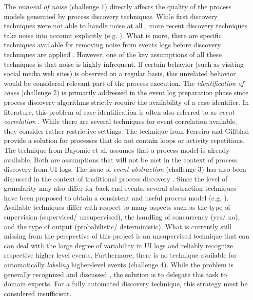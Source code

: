 The \textit{removal of noise} (challenge 1) directly affects the quality of the process models generated by process discovery techniques. While first discovery techniques were not able to handle noise at all \cite{van2004workflow}, more recent discovery techniques take noise into account explicitly (e.g. \cite{weijters2003rediscovering,leemans2013discovering,van2016avoiding}). What is more, there are specific techniques available for removing noise from events logs before discovery techniques are applied \cite{tax2017discovering,CHENG2015138}. However, one of the key assumptions of all these techniques is that noise is highly infrequent. If certain behavior (such as visiting social media web sites) is observed on a regular basis, this unrelated behavior would be considered relevant part of the process execution. 
%
The\textit{ identification of cases} (challenge 2) is primarily addressed in the event log preparation phase since process discovery algorithms strictly require the availability of a case identifier. In literature, this problem of case identification is often also referred to as \textit{event correlation} \cite{diba2020extraction}. While there are several techniques for event correlation available, they consider rather restrictive settings. The technique from Ferreira and Gillblad  \cite{ferreira2009discovering} provide a solution for processes that do not contain loops or activity repetitions. The technique from Bayomie et al. \cite{bayomie2019probabilistic} assumes that a process model is already available. Both are assumptions that will not be met in the context of process discovery from UI logs. 
%
The issue of \textit{event abstraction} (challenge 3) has also been discussed in the context of traditional process discovery \cite{van2020event,diba2020extraction}. Since the level of granularity may also differ for back-end events, several abstraction techniques have been proposed to obtain a consistent and useful process model (e.g. \cite{baier2014bridging,van2020event,de2020event}). Available techniques differ with respect to many aspects such as the type of supervision (supervised/ unsupervised), the handling of concurrency (yes/ no), and the type of output (probabilistic/ deterministic). What is currently still missing from the perspective of this project is an unsupervised technique that can can deal with the large degree of variability in UI logs and reliably recognize respective higher level events. 
%
Furthermore, there is no technique available for automatically \textit{labeling} higher-level events (challenge 4). While the problem is generally recognized and discussed \cite{van2020event,van2016enabling}, the  solution is to delegate this task to domain experts. For a fully automated discovery technique, this strategy must be considered insufficient.   
 
